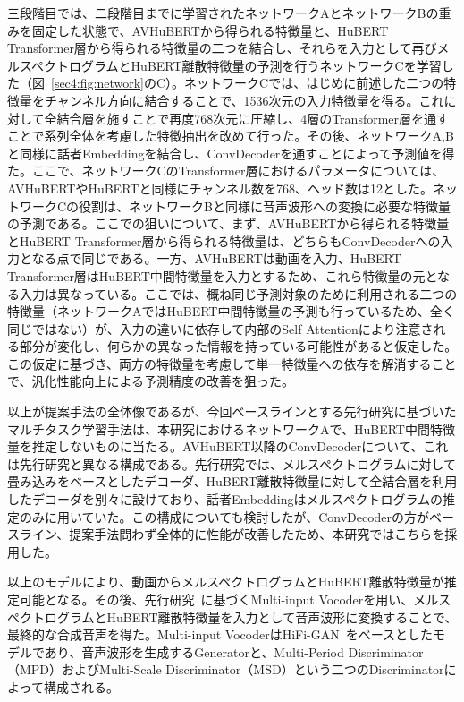 \documentclass[12pt]{jarticle}
\numberwithin{equation}{section}    %
\numberwithin{figure}{section}      %
\numberwithin{table}{section}      %
\begin{document}
三段階目では、二段階目までに学習されたネットワークAとネットワークBの重みを固定した状態で、AVHuBERTから得られる特徴量と、HuBERT Transformer層から得られる特徴量の二つを結合し、それらを入力として再びメルスペクトログラムとHuBERT離散特徴量の予測を行うネットワークCを学習した（図~\ref{sec4:fig:network}のC）。ネットワークCでは、はじめに前述した二つの特徴量をチャンネル方向に結合することで、1536次元の入力特徴量を得る。これに対して全結合層を施すことで再度768次元に圧縮し、4層のTransformer層を通すことで系列全体を考慮した特徴抽出を改めて行った。その後、ネットワークA,Bと同様に話者Embeddingを結合し、ConvDecoderを通すことによって予測値を得た。ここで、ネットワークCのTransformer層におけるパラメータについては、AVHuBERTやHuBERTと同様にチャンネル数を768、ヘッド数は12とした。ネットワークCの役割は、ネットワークBと同様に音声波形への変換に必要な特徴量の予測である。ここでの狙いについて、まず、AVHuBERTから得られる特徴量とHuBERT Transformer層から得られる特徴量は、どちらもConvDecoderへの入力となる点で同じである。一方、AVHuBERTは動画を入力、HuBERT Transformer層はHuBERT中間特徴量を入力とするため、これら特徴量の元となる入力は異なっている。ここでは、概ね同じ予測対象のために利用される二つの特徴量（ネットワークAではHuBERT中間特徴量の予測も行っているため、全く同じではない）が、入力の違いに依存して内部のSelf Attentionにより注意される部分が変化し、何らかの異なった情報を持っている可能性があると仮定した。この仮定に基づき、両方の特徴量を考慮して単一特徴量への依存を解消することで、汎化性能向上による予測精度の改善を狙った。

以上が提案手法の全体像であるが、今回ベースラインとする先行研究\cite{choi2023intelligible}に基づいたマルチタスク学習手法は、本研究におけるネットワークAで、HuBERT中間特徴量を推定しないものに当たる。AVHuBERT以降のConvDecoderについて、これは先行研究と異なる構成である。先行研究では、メルスペクトログラムに対して畳み込みをベースとしたデコーダ、HuBERT離散特徴量に対して全結合層を利用したデコーダを別々に設けており、話者Embeddingはメルスペクトログラムの推定のみに用いていた。この構成についても検討したが、ConvDecoderの方がベースライン、提案手法問わず全体的に性能が改善したため、本研究ではこちらを採用した。

以上のモデルにより、動画からメルスペクトログラムとHuBERT離散特徴量が推定可能となる。その後、先行研究~\cite{choi2023intelligible}に基づくMulti-input Vocoderを用い、メルスペクトログラムとHuBERT離散特徴量を入力として音声波形に変換することで、最終的な合成音声を得た。Multi-input VocoderはHiFi-GAN~\cite{kong2020hifi}をベースとしたモデルであり、音声波形を生成するGeneratorと、Multi-Period Discriminator（MPD）およびMulti-Scale Discriminator（MSD）という二つのDiscriminatorによって構成される。
\end{document}
